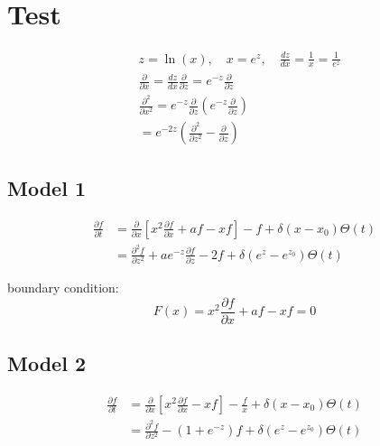 \documentclass{article}
\begin{document}
\section{Test}
    \begin{equation}
        \begin{split}
            &z = \ln(x), \quad x = e^z, \quad \frac{dz}{dx} = \frac{1}{x} = \frac{1}{e^z}
            \\
            & \frac{\partial }{\partial x} = \frac{dz}{dx} \frac{\partial } {\partial z}
            = e^{-z} \frac{\partial }{\partial z}
            \\
            & \frac{\partial^2 }{\partial x^2} = e^{-z} \frac{\partial } {\partial z}
            \left(e^{-z} \frac{\partial }{\partial z}\right) 
            \\
            & = e^{-2z}\left( \frac{\partial^2}{\partial z^2} - \frac{\partial }{\partial z}
                       \right)
        \end{split}
    \end{equation}
\subsection{Model 1}
    \begin{equation}
        \begin{split}
            \frac{\partial f} {\partial t} &= \frac{\partial}{\partial x}
            \left[x^2 \frac{\partial f}{\partial x} + af - xf\right]
             - f 
             + \delta(x-x_0)\Theta(t)
             \\
            &= \frac{\partial^2 f}{\partial z^2}
            + ae^{-z} \frac{\partial f}{\partial z}
            - 2f
            + \delta(e^{z}-e^{z_0})\Theta(t)
        \end{split}
    \end{equation}

    boundary condition:
    \begin{equation}
        F(x) = x^2 \frac{\partial f}{\partial x} + af - xf = 0
    \end{equation}

\subsection{Model 2}
    \begin{equation}
        \begin{split}
            \frac{\partial f} {\partial t} &= \frac{\partial}{\partial x}
            \left[x^2 \frac{\partial f}{\partial x} - xf\right]
             - \frac{f}{x}
             + \delta(x-x_0)\Theta(t)
             \\
            &= \frac{\partial^2 f}{\partial z^2}
            - \left(1+e^{-z}\right) f
            + \delta(e^{z}-e^{z_0})\Theta(t)
        \end{split}
    \end{equation}
\end{document}
